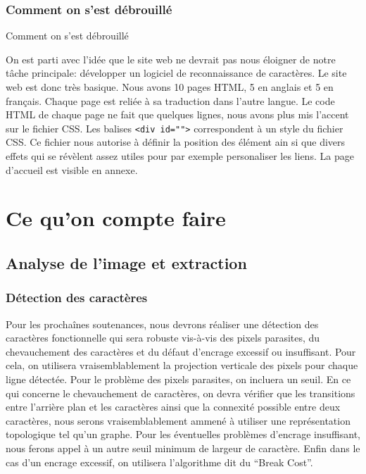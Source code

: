 \documentclass[]{report}
\begin{document}
		\section{Comment on s'est d\'ebrouill\'e} %
		\label{sec:comment_on_s_est_d'ebrouill'e}
		Comment on s'est débrouillé

			On est parti avec l'idée que le site web ne devrait pas nous éloigner de notre tâche principale: développer un logiciel de reconnaissance de caractères. Le site web est donc tr\`es basique. Nous avons 10 pages HTML, 5 en anglais et 5 en fran\c cais. Chaque page est reli\'ee \`a sa traduction dans l'autre langue.
			Le code HTML de chaque page ne fait que quelques lignes, nous avons plus mis l'accent sur le fichier CSS. Les balises \verb!<div id="">! correspondent \`a un style du fichier CSS. Ce fichier nous autorise \`a d\'efinir la position des \'el\'ement ain si que divers effets qui se r\'ev\`elent assez utiles pour par exemple personaliser les liens.
			La page d'accueil est visible en annexe.
			 




\part{Ce qu'on compte faire} %
\label{prt:ce_qu_on_compte_faire}

	\chapter{Analyse de l'image et extraction} %
	\label{cha:analyse_de_l'image_et_extraction}

    \section{D\'etection des caractères} %
    \label{sec:d'etection_des_caractères}
      Pour les prochaînes soutenances, nous devrons réaliser une détection des caractères fonctionnelle qui sera robuste vis-à-vis des pixels parasites, du chevauchement des caractères et du défaut d'encrage excessif ou insuffisant. Pour cela, on utilisera vraisemblablement la projection verticale des pixels pour chaque ligne détectée. Pour le problème des pixels parasites, on incluera un seuil. En ce qui concerne le  chevauchement de caractères, on devra vérifier que les transitions entre l'arrière plan et les caractères ainsi que la connexité possible entre deux caractères, nous serons vraisemblablement ammené à utiliser une représentation topologique tel qu'un graphe. Pour les éventuelles problèmes d'encrage insuffisant, nous ferons appel à un autre seuil minimum de largeur de caractère. Enfin dans le cas d'un encrage excessif, on utilisera l'algorithme dit du ``Break Cost''.
\end{document}
